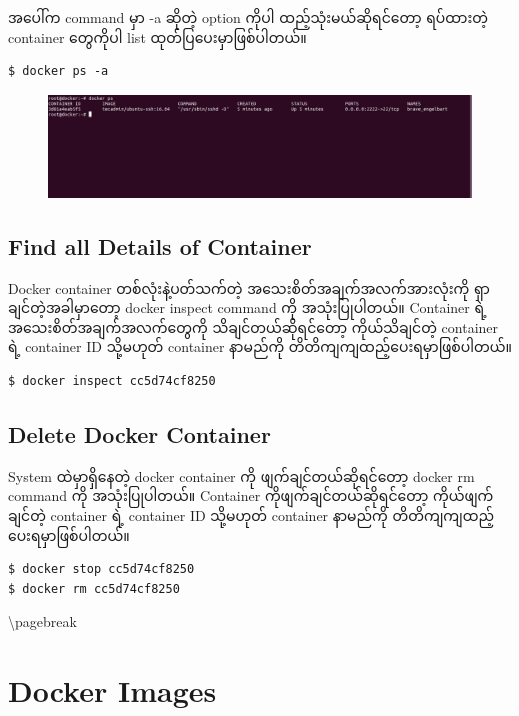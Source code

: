 အပေါ်က command မှာ -a ဆိုတဲ့ option ကိုပါ ထည့်သုံးမယ်ဆိုရင်တော့
ရပ်ထားတဲ့ container တွေကိုပါ list ထုတ်ပြပေးမှာဖြစ်ပါတယ်။

\begin{verbatim}
$ docker ps -a
\end{verbatim}

\begin{figure}[htbp]
\centering
\includegraphics{.gitbook/assets/4a_ps-large-resolution.png}
\end{figure}

\subsection{Find all Details of
Container}\label{find-all-details-of-container}

Docker container တစ်လုံးနဲ့ပတ်သက်တဲ့ အသေးစိတ်အချက်အလက်အားလုံးကို
ရှာချင်တဲ့အခါမှာတော့ docker inspect command ကို အသုံးပြုပါတယ်။ Container
ရဲ့ အသေးစိတ်အချက်အလက်တွေကို သိချင်တယ်ဆိုရင်တော့ ကိုယ်သိချင်တဲ့ container
ရဲ့ container ID သို့မဟုတ် container နာမည်ကို
တိတိကျကျထည့်ပေးရမှာဖြစ်ပါတယ်။

\begin{verbatim}
$ docker inspect cc5d74cf8250
\end{verbatim}

\subsection{Delete Docker Container}\label{delete-docker-container}

System ထဲမှာရှိနေတဲ့ docker container ကို ဖျက်ချင်တယ်ဆိုရင်တော့ docker
rm command ကို အသုံးပြုပါတယ်။ Container ကိုဖျက်ချင်တယ်ဆိုရင်တော့
ကိုယ်ဖျက်ချင်တဲ့ container ရဲ့ container ID သို့မဟုတ် container နာမည်ကို
တိတိကျကျထည့်ပေးရမှာဖြစ်ပါတယ်။

\begin{verbatim}
$ docker stop cc5d74cf8250
$ docker rm cc5d74cf8250
\end{verbatim}

\textbackslash{}pagebreak

\section{Docker Images}\label{docker-images}

